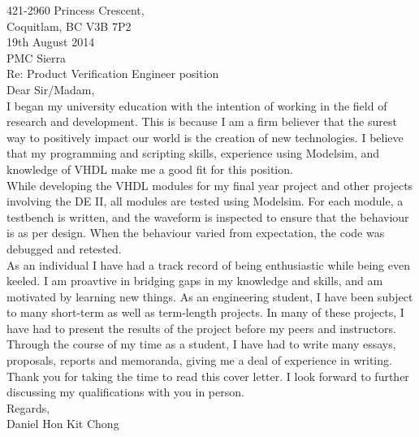 \documentclass[10pt,a4paper]{article}
\begin{document}
\flushleft
\large
421-2960 Princess Crescent,\\
Coquitlam, BC V3B 7P2 \\
\medskip
19th August 2014 \\
\medskip
PMC Sierra\\
\medskip
Re: Product Verification Engineer position\\
\medskip
Dear Sir/Madam,\\

\medskip
\hspace{10mm}
I began my university education with the intention of working in the field of research and development. This is because I am a firm believer that the 
surest way to positively impact our world is the creation of new technologies. I believe that my programming and scripting skills, experience 
using Modelsim, and knowledge of VHDL make me a good fit for this position.
\\
\medskip
\hspace{10mm}
While developing the VHDL modules for my final year project and other projects involving the DE II, all modules are tested using Modelsim. For each 
module, a testbench is written, and the waveform is inspected to ensure that the behaviour is as per design. 
When the behaviour varied from expectation, the code was debugged and retested.
\\
\medskip
\hspace{10mm}
As an individual I have had a track record of being enthusiastic while being even keeled. 
I am proavtive in bridging gaps in my knowledge and skills, and am motivated by learning new things.
As an engineering student, I have been subject to many short-term as well as term-length projects.
In many of these projects, I have had to present the results of the project before my peers and instructors.
Through the course of my time as a student, I have had to write many essays, proposals, reports and memoranda, giving me a deal of experience in writing.
\\
\medskip
\hspace{10mm}
Thank you for taking the time to read this cover letter.
I look forward to further discussing my qualifications with you in person.\\


\bigskip
Regards, \\
Daniel Hon Kit Chong
\end{document}
